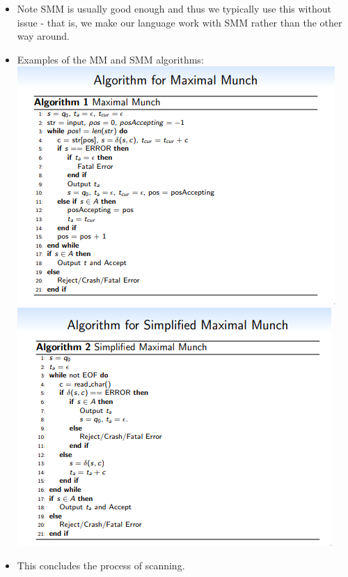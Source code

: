 \documentclass[12pt]{article}
\begin{document}
\begin{itemize}
    \item Note SMM is usually good enough and thus we typically use this without issue - that is, we make our language work with SMM rather than the other way around.
    \item Examples of the MM and SMM algorithms: \\
        \includegraphics[scale=0.8]{mmalg.png} \\
        \includegraphics[scale=0.8]{smmalg.png}
    \item This concludes the process of scanning. 
\end{itemize}
\end{document}
